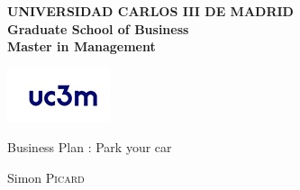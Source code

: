 \documentclass[12pt,a4paper,oneside]{book}
\begin{document}


\begin{titlepage}
\noindent \begin{minipage}{0.83\textwidth}
\noindent \textbf{UNIVERSIDAD CARLOS III DE MADRID}\hfill{}\\
\textbf{Graduate School of Business}\hfill{}\\
\textbf{Master in Management}\hfill{}
\end{minipage}
\begin{minipage}{0.17\textwidth}
\includegraphics[keepaspectratio=true,width=\textwidth]{images/logo_UC3M_universidad_Carlos_III_Madrid.jpg}
\end{minipage}
\begin{center}
\vfill{}\vfill{}\vfill{}
{\Huge Business Plan : Park your car}
{\Huge \par}
\begin{center}{\LARGE Simon \textsc{Picard}}\end{center}{\Huge \par}
\vfill{}

\end{center}
\end{titlepage}
\end{document}
